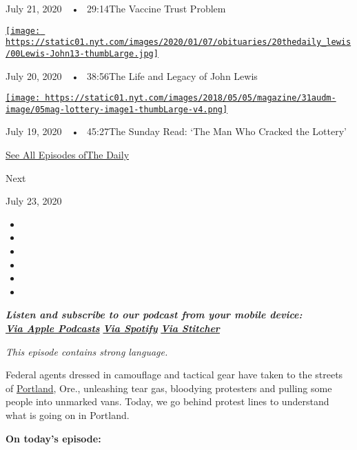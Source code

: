 July 21, 2020~~•~ 29:14The Vaccine Trust Problem

\href{https://www.nytimes.com/2020/07/20/podcasts/the-daily/john-lewis.html?action=click\&module=audio-series-bar\&region=header\&pgtype=Article}{\texttt{[image: https://static01.nyt.com/images/2020/01/07/obituaries/20thedaily\_lewis/00Lewis-John13-thumbLarge.jpg]}}

July 20, 2020~~•~ 38:56The Life and Legacy of John Lewis

\href{https://www.nytimes.com/2020/07/19/podcasts/the-daily/lottery-winner-scam.html?action=click\&module=audio-series-bar\&region=header\&pgtype=Article}{\texttt{[image: https://static01.nyt.com/images/2018/05/05/magazine/31audm-image/05mag-lottery-image1-thumbLarge-v4.png]}}

July 19, 2020~~•~ 45:27The Sunday Read: `The Man Who Cracked the
Lottery'

\href{https://www.nytimes.com/column/the-daily}{See All Episodes ofThe
Daily}

Next

July 23, 2020

\begin{itemize}
\item
\item
\item
\item
\item
\item
\end{itemize}

\emph{\textbf{Listen and subscribe to our podcast from your mobile
device:}}\\
\textbf{\href{https://itunes.apple.com/us/podcast/the-daily/id1200361736?mt=2}{\emph{Via
Apple Podcasts}}} \emph{\textbf{\textbar{}}}
\textbf{\href{https://open.spotify.com/show/3IM0lmZxpFAY7CwMuv9H4g?si=SfuMSC55R1qprFsRZU3_zw}{\emph{Via
Spotify}}} \emph{\textbf{\textbar{}}}
\textbf{\href{http://www.stitcher.com/podcast/the-new-york-times/the-daily-10}{\emph{Via
Stitcher}}}

\emph{This episode contains strong language.}

Federal agents dressed in camouflage and tactical gear have taken to the
streets of
\href{https://www.nytimes.com/2020/07/23/upshot/trump-portland.html}{Portland},
Ore., unleashing tear gas, bloodying protesters and pulling some people
into unmarked vans. Today, we go behind protest lines to understand what
is going on in Portland.

\textbf{On today's episode:}

